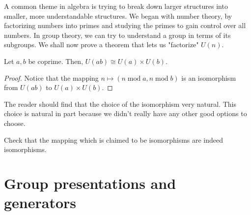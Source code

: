\documentclass[./main.tex]{subfiles}
\begin{document}
A common theme in algebra is trying to break down larger structures into
smaller, more understandable structures. We began with number theory, by
factorizing numbers into primes and studying the primes to gain control over all
numbers. In group theory, we can try to understand a group in terms of its
subgroups. We shall now prove a theorem that lets us "factorize" $U(n)$. 
\begin{theorem}[Structure of $U(n)$]
    Let $a, b$ be coprime. Then, $U(ab) \cong U(a) \times U(b)$.
\end{theorem}
\begin{proof}
    Notice that the mapping $n \mapsto (n \operatorname{mod} a, n
    \operatorname{mod} b)$ is an isomorphism from $U(ab)$ to $U(a) \times U(b)$.
\end{proof}
The reader should find that the choice of the isomorphism very natural. This
choice is natural in part because we didn't really have any other good options
to choose. 
\begin{exercise}
    Check that the mapping which is claimed to be isomorphisms are indeed isomorphisms.
\end{exercise}


\section{Group presentations and generators}


\end{document}
